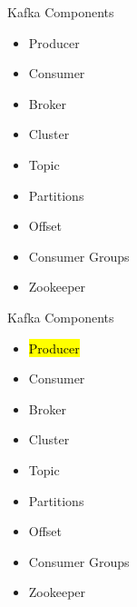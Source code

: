 \documentclass{beamer}
\begin{document}
\begin{frame}{Kafka Components}
  \begin{itemize}
    \item Producer
    \item Consumer
    \item Broker
    \item Cluster
    \item Topic
    \item Partitions
    \item Offset
    \item Consumer Groups
    \item Zookeeper
  \end{itemize}
\end{frame}

\begin{frame}{Kafka Components}
  \begin{itemize}
    \item \hl{Producer}
    \item Consumer
    \item Broker
    \item Cluster
    \item Topic
    \item Partitions
    \item Offset
    \item Consumer Groups
    \item Zookeeper
  \end{itemize}
\end{frame}
\end{document}
